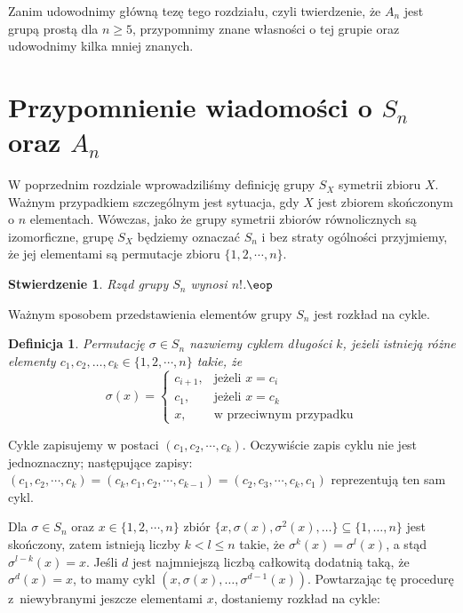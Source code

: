 \documentclass[licencjacka]{pracamgr}
\newtheorem{deff}{Definicja}[section]
\newtheorem{fact}{Stwierdzenie}[section]
\begin{document}
Zanim udowodnimy główną tezę tego rozdziału, czyli twierdzenie, że $A_n$
jest grupą prostą dla $n \ge 5$, przypomnimy znane własności o tej
grupie oraz udowodnimy kilka mniej znanych.

\section{Przypomnienie wiadomości o $S_n$ oraz $A_n$}

W poprzednim rozdziale wprowadziliśmy definicję grupy $S_X$ symetrii
zbioru $X$. Ważnym przypadkiem szczególnym jest sytuacja, gdy $X$
jest zbiorem skończonym o $n$ elementach. Wówczas, jako że grupy
symetrii zbiorów równolicznych są izomorficzne, grupę $S_X$ będziemy
oznaczać $S_n$ i bez straty ogólności przyjmiemy, że jej elementami
są permutacje zbioru $\{1, 2, \cdots, n\}$.

\begin{fact}
    Rząd grupy $S_n$ wynosi $n!$.\quad$\eop$
\end{fact}

Ważnym sposobem przedstawienia elementów grupy $S_n$ jest rozkład na
cykle.

\begin{deff}    %
    Permutację $\sigma \in S_n$ nazwiemy \emph{cyklem długości $k$},
    jeżeli istnieją różne elementy $c_1, c_2, \ldots, c_k \in \{1, 2, \cdots, n\}$ takie, że
    $$ \sigma(x) = \left\{
                \begin{array}{ll}
                    c_{i+1}, & \textrm{jeżeli $x = c_i$}\\
                    c_1,     & \textrm{jeżeli $x = c_k$}\\
                    x,       & \textrm{w przeciwnym przypadku}
                \end{array} \right.
    $$
\end{deff}

Cykle zapisujemy w postaci $(c_1, c_2, \cdots, c_k)$. Oczywiście zapis cyklu nie jest jednoznaczny; 
następujące zapisy: $(c_1, c_2, \cdots, c_k) = (c_k, c_1, c_2, \cdots, c_{k-1}) = (c_2, c_3, \cdots, c_k,
c_1)$ reprezentują ten sam cykl.

Dla $\sigma \in S_n$ oraz $x\in\{1, 2,\cdots, n\}$ zbiór
$\{x,\sigma(x),\sigma^2(x),\ldots\}\subseteq\{1,\ldots,n\}$ jest skończony, zatem istnieją
liczby $k<l\leq n$ takie, że $\sigma^k(x)=\sigma^l(x)$, a stąd $\sigma^{l-k}(x)=x$. Jeśli $d$ jest najmniejszą
liczbą całkowitą dodatnią taką, że $\sigma^d(x)=x$, to mamy cykl $\left(x,\sigma(x),\ldots,\sigma^{d-1}(x)\right)$.
Powtarzając tę procedurę z~niewybranymi jeszcze elementami $x$, dostaniemy rozkład na cykle:
\end{document}
